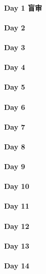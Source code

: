 \documentclass[UTF8,a4paper,8pt]{ctexart}
\begin{document}
 	 \paragraph{Day 1   盲审    \quad     }
 	 \paragraph{Day 2       \quad     }
 	 \paragraph{Day 3       \quad     }
 	 \paragraph{Day 4       \quad     }
 	 \paragraph{Day 5       \quad     }
 	 \paragraph{Day 6       \quad     }
 	 \paragraph{Day 7       \quad     }
 	 \paragraph{Day 8       \quad     }
 	 \paragraph{Day 9       \quad     }
 	 \paragraph{Day 10      \quad     }
 	 \paragraph{Day 11      \quad     }
 	 \paragraph{Day 12      \quad     }
 	 \paragraph{Day 13      \quad     }
 	 \paragraph{Day 14      \quad     }
\end{document}
